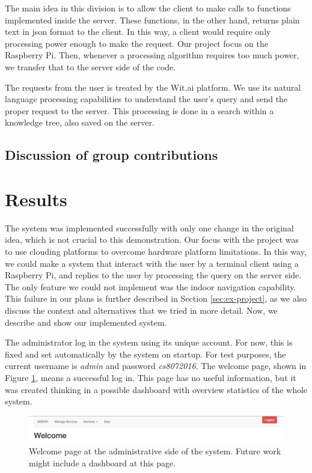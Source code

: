 The main idea in this division is to allow the client to make calls to functions implemented inside the server.
These functions, in the other hand, returns plain text in json format to the client.
In this way, a client would require only processing power enough to make the request.
Our project focus on the Raspberry Pi.
Then, whenever a processing algorithm requires too much power, we transfer that to the server side of the code.

The requests from the user is treated by the Wit.ai platform.
We use its natural language processing capabilities to understand the user's query and send the proper request to the server.
This processing is done in a search within a knowledge tree, also saved on the server.

\subsection{Discussion of group contributions}



\section{Results}

The system was implemented successfully with only one change in the original idea, which is not crucial to this demonstration.
Our focus with the project was to use clouding platforms to overcome hardware platform limitations.
In this way, we could make a system that interact with the user by a terminal client using a Raspberry Pi, and replies to the user by processing the query on the server side.
The only feature we could not implement was the indoor navigation capability.
This failure in our plans is further described in Section \ref{sec:ex-project}, as we also discuss the context and alternatives that we tried in more detail.
Now, we describe and show our implemented system.

The administrator log in the system using its unique account.
For now, this is fixed and set automatically by the system on startup.
For test purposes, the current username is \emph{admin} and password \emph{cs8072016}.
The welcome page, shown in Figure \ref{fig:sys_welcome}, means a successful log in.
This page has no useful information, but it was created thinking in a possible dashboard with overview statistics of the whole system.

\begin{figure}[htbp]
\begin{center}
\includegraphics[width=\textwidth]{figures/welcome.png}
\caption{Welcome page at the administrative side of the system. Future work might include a dashboard at this page.}
\label{fig:sys_welcome}
\end{center}
\end{figure}

